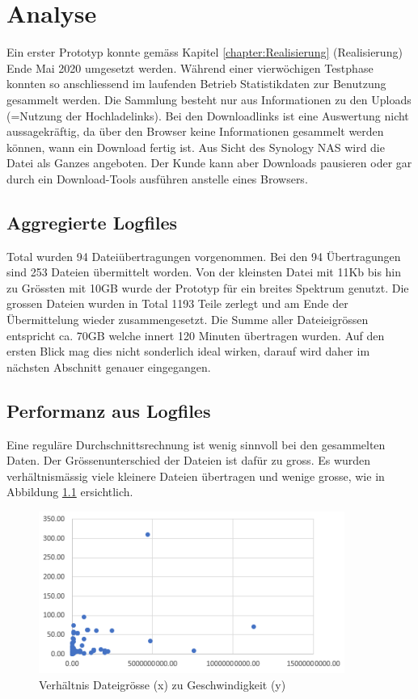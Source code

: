 \chapter{Analyse}
Ein erster Prototyp konnte gemäss Kapitel \ref{chapter:Realisierung} (Realisierung) Ende Mai 2020 umgesetzt werden.
Während einer vierwöchigen Testphase konnten so anschliessend im laufenden Betrieb Statistikdaten zur Benutzung gesammelt werden.
Die Sammlung besteht nur aus Informationen zu den Uploads (=Nutzung der Hochladelinks).
Bei den Downloadlinks ist eine Auswertung nicht aussagekräftig, da über den Browser keine Informationen gesammelt werden können, wann ein Download fertig ist. 
Aus Sicht des Synology NAS wird die Datei als Ganzes angeboten. Der Kunde kann aber Downloads pausieren oder gar durch ein Download-Tools ausführen anstelle eines Browsers.

\section{Aggregierte Logfiles}
Total wurden 94 Dateiübertragungen vorgenommen. Bei den 94 Übertragungen sind 253 Dateien übermittelt worden.
Von der kleinsten Datei mit 11Kb bis hin zu Grössten mit 10GB wurde der Prototyp für ein breites Spektrum genutzt.
Die grossen Dateien wurden in Total 1193 Teile zerlegt und am Ende der Übermittelung wieder zusammengesetzt. 
Die Summe aller Dateieigrössen entspricht ca. 70GB welche innert 120 Minuten übertragen wurden. 
Auf den ersten Blick mag dies nicht sonderlich ideal wirken, darauf wird daher im nächsten Abschnitt genauer eingegangen.

\section{Performanz aus Logfiles}
Eine reguläre Durchschnittsrechnung ist wenig sinnvoll bei den gesammelten Daten. 
Der Grössenunterschied der Dateien ist dafür zu gross. Es wurden verhältnismässig viele kleinere Dateien übertragen und wenige grosse,
wie in Abbildung \ref{fig:diagramme2} ersichtlich.

\begin{figure}[!h]
    \centering
    \includegraphics[width=0.5\linewidth]{content/images/diagramme2.png}
    \caption{Verhältnis Dateigrösse (x) zu Geschwindigkeit (y)}
    \label{fig:diagramme2}
\end{figure} 


